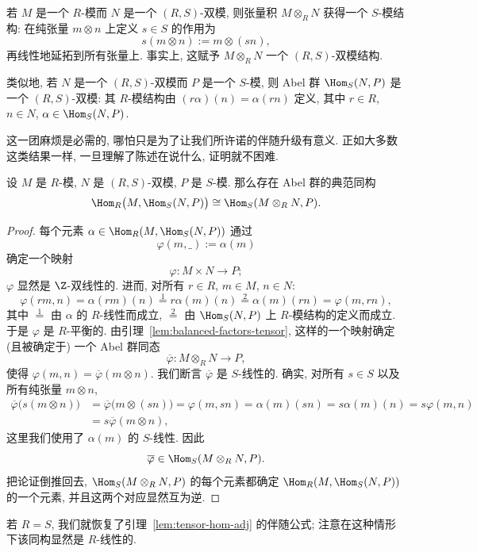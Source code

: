 若 $M$ 是一个 $R$-模而 $N$ 是一个 $(R,S)$-双模, 则张量积 $M\otimes_R N$ 获得一个 $S$-模结构: 在纯张量 $m\otimes n$ 上定义 $s\in S$ 的作用为
\[
s(m\otimes n):=m\otimes(sn),
\]
再线性地延拓到所有张量上. 事实上, 这赋予 $M\otimes_R N$ 一个 $(R,S)$-双模结构.

类似地, 若 $N$ 是一个 $(R,S)$-双模而 $P$ 是一个 $S$-模, 则 Abel 群 $\Hom_S(N,P)$ 是一个 $(R,S)$-双模: 其 $R$-模结构由 $(r\alpha)(n)=\alpha(rn)$ 定义, 其中 $r\in R$, $n\in N$, $\alpha\in\Hom_S(N,P)$.

这一团麻烦是必需的, 哪怕只是为了让我们所许诺的伴随升级有意义. 正如大多数这类结果一样, 一旦理解了陈述在说什么, 证明就不困难.

\begin{lemma}\label{lem:hom-tensor-adj-bimodule}
设 $M$ 是 $R$-模, $N$ 是 $(R,S)$-双模, $P$ 是 $S$-模. 那么存在 Abel 群的典范同构
\[
\Hom_R\bigl(M,\Hom_S(N,P)\bigr)\cong\Hom_S(M\otimes_R N,P).
\]
\end{lemma}

\begin{proof}
每个元素 $\alpha\in\Hom_R(M,\Hom_S(N,P))$ 通过
\[
\varphi(m,\_):=\alpha(m)
\]
确定一个映射
\[
\varphi:M\times N\to P;
\]
$\varphi$ 显然是 $\Z$-双线性的. 进而, 对所有 $r\in R$, $m\in M$, $n\in N$:
\[
\varphi(rm,n)=\alpha(rm)(n)\stackrel{1}{=}r\alpha(m)(n)\stackrel{2}{=}\alpha(m)(rn)=\varphi(m,rn),
\]
其中 $\stackrel{1}{=}$ 由 $\alpha$ 的 $R$-线性而成立, $\stackrel{2}{=}$ 由 $\Hom_S(N,P)$ 上 $R$-模结构的定义而成立. 于是 $\varphi$ 是 $R$-平衡的. 由引理~\ref{lem:balanced-factors-tensor}, 这样的一个映射确定 (且被确定于) 一个 Abel 群同态
\[
\overline{\varphi}:M\otimes_R N\to P,
\]
使得 $\varphi(m,n)=\overline{\varphi}(m\otimes n)$. 我们断言 $\overline{\varphi}$ 是 $S$-线性的. 确实, 对所有 $s\in S$ 以及所有纯张量 $m\otimes n$,
\[
\begin{aligned}
\overline{\varphi}\bigl(s(m\otimes n)\bigr)&=\overline{\varphi}\bigl(m\otimes(sn)\bigr)=\varphi(m,sn)=\alpha(m)(sn)=s\alpha(m)(n)=s\varphi(m,n)\\
&=s\overline{\varphi}(m\otimes n),
\end{aligned}
\]
这里我们使用了 $\alpha(m)$ 的 $S$-线性. 因此
\[
\overline{\varphi}\in\Hom_S(M\otimes_R N,P).
\]
把论证倒推回去, $\Hom_S(M\otimes_R N,P)$ 的每个元素都确定 $\Hom_R(M,\Hom_S(N,P))$ 的一个元素, 并且这两个对应显然互为逆.
\end{proof}

若 $R=S$, 我们就恢复了引理~\ref{lem:tensor-hom-adj} 的伴随公式; 注意在这种情形下该同构显然是 $R$-线性的.

